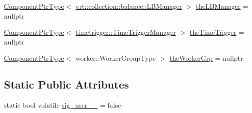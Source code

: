 \begin{DoxyCompactItemize}
\item 
\hyperlink{structvt_1_1runtime_1_1_runtime_a0893bf0a8c03b898e8ab66b52cec80ad}{Component\+Ptr\+Type}$<$ \hyperlink{structvt_1_1vrt_1_1collection_1_1balance_1_1_l_b_manager}{vrt\+::collection\+::balance\+::\+L\+B\+Manager} $>$ \hyperlink{structvt_1_1runtime_1_1_runtime_a0d324f5964ce89e2974a41bc3129829e}{the\+L\+B\+Manager} = nullptr
\item 
\hyperlink{structvt_1_1runtime_1_1_runtime_a0893bf0a8c03b898e8ab66b52cec80ad}{Component\+Ptr\+Type}$<$ \hyperlink{structvt_1_1timetrigger_1_1_time_trigger_manager}{timetrigger\+::\+Time\+Trigger\+Manager} $>$ \hyperlink{structvt_1_1runtime_1_1_runtime_a3d72d73ecd4ba3f0104dca596eae3862}{the\+Time\+Trigger} = nullptr
\item 
\hyperlink{structvt_1_1runtime_1_1_runtime_a0893bf0a8c03b898e8ab66b52cec80ad}{Component\+Ptr\+Type}$<$ worker\+::\+Worker\+Group\+Type $>$ \hyperlink{structvt_1_1runtime_1_1_runtime_a80634e73cafbe273448123746789fccb}{the\+Worker\+Grp} = nullptr
\end{DoxyCompactItemize}
\subsection*{Static Public Attributes}
\begin{DoxyCompactItemize}
\item 
static bool volatile \hyperlink{structvt_1_1runtime_1_1_runtime_ac0373f2326b45f348e2db166d328e2d6}{sig\+\_\+user\+\_\+\_\+} = false
\end{DoxyCompactItemize}
